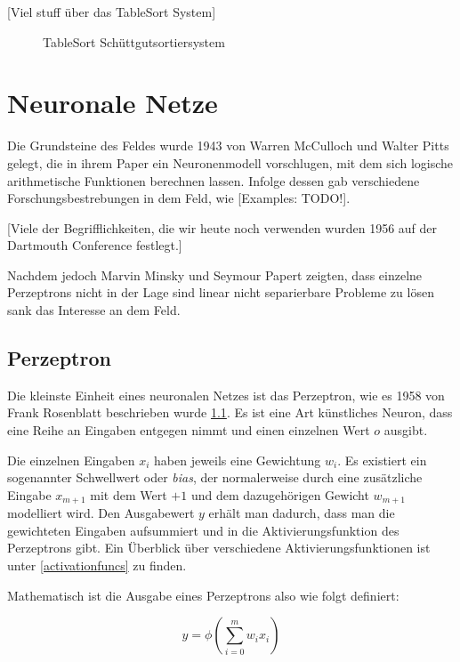 [Viel stuff über das TableSort System]

\begin{figure}
	\caption{TableSort Schüttgutsortiersystem}
	\label{tablesortsystemimage}
\end{figure}

\section{Neuronale Netze}

Die Grundsteine des Feldes wurde 1943 von Warren McCulloch und Walter Pitts gelegt, 
die in ihrem Paper ein Neuronenmodell vorschlugen, mit dem sich logische arithmetische Funktionen berechnen lassen. 
Infolge dessen gab verschiedene Forschungsbestrebungen in dem Feld, wie [Examples: TODO!].

[Viele der Begrifflichkeiten, die wir heute noch verwenden wurden 1956 auf der Dartmouth Conference festlegt.]

Nachdem jedoch Marvin Minsky und Seymour Papert zeigten, dass einzelne Perzeptrons nicht in der Lage sind linear nicht separierbare Probleme zu lösen sank das Interesse an dem Feld.

\subsection{Perzeptron}
Die kleinste Einheit eines neuronalen Netzes ist das Perzeptron, wie es 1958 von Frank Rosenblatt beschrieben wurde \ref{}.
Es ist eine Art künstliches Neuron, dass eine Reihe an Eingaben entgegen nimmt und einen einzelnen Wert $o$ ausgibt.


Die einzelnen Eingaben $x_i$ haben jeweils eine Gewichtung $w_i$.
Es existiert ein sogenannter Schwellwert oder \textit{bias}, der normalerweise 
durch eine zusätzliche Eingabe $x_{m+1}$ mit dem Wert $+1$ und dem dazugehörigen Gewicht $w_{m+1}$ modelliert wird.
Den Ausgabewert $y$ erhält man dadurch, dass man die gewichteten Eingaben aufsummiert und in die Aktivierungsfunktion des Perzeptrons gibt.
Ein Überblick über verschiedene Aktivierungsfunktionen ist unter \ref{activationfuncs} zu finden.

Mathematisch ist die Ausgabe eines Perzeptrons also wie folgt definiert:

\begin{equation}
	y = \phi ( \sum_{i= 0}^{m} w_i x_i)
\end{equation}

